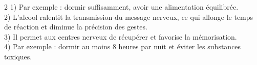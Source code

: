 \begin{multicols}{2}
1) Par exemple : dormir suffisamment, avoir une alimentation équilibrée.\\
2) L'alcool ralentit la transmission du message nerveux, ce qui allonge le temps de
réaction et diminue la précision des gestes.\\
3) Il permet aux centres nerveux de récupérer et favorise la mémorisation.\\
4) Par exemple : dormir au moins $8$ heures par nuit et éviter les substances toxiques.

\end{multicols}
\exercicesBanner
